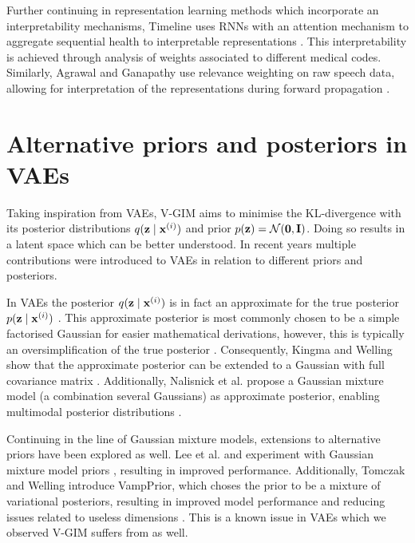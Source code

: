 	Further continuing in representation learning methods which incorporate an interpretability mechanisms, Timeline uses RNNs with an attention mechanism to aggregate sequential health to interpretable representations \cite{baiInterpretableRepresentationLearning2018}. This interpretability is achieved through analysis of weights associated to different medical codes. Similarly, Agrawal and Ganapathy use relevance weighting on raw speech data, allowing for interpretation of the representations during forward propagation \cite{agrawalInterpretableRepresentationLearning2020}.
	
	
	
		

\section{Alternative priors and posteriors in VAEs}	%
Taking inspiration from VAEs, V-GIM aims to minimise the KL-divergence with its posterior distributions $q (\mathbf{z} \mid \mathbf{x}^{(i)})$ and prior $p(\mathbf{z})=\mathcal{N}(\bm{\mathbf{0}}, \mathbf{I})$. Doing so results in a latent space which can be better understood. In recent years multiple contributions were introduced to VAEs in relation to different priors and posteriors.

In VAEs the posterior $q (\mathbf{z} \mid \mathbf{x}^{(i)})$ is in fact an approximate for the true posterior $p (\mathbf{z} \mid \mathbf{x}^{(i)})$ \cite{odaiboTutorialDerivingStandard2019}. This approximate posterior is most commonly chosen to be a simple factorised Gaussian for easier mathematical derivations, however, this is typically an oversimplification of the true posterior \cite{nalisnickApproximateInferenceDeep}. Consequently, Kingma and Welling show that the approximate posterior can be extended to a Gaussian with full covariance matrix \cite{kingmaIntroductionVariationalAutoencoders2019}. Additionally, Nalisnick et al. propose a Gaussian mixture model (a combination several Gaussians) as approximate posterior, enabling multimodal posterior distributions \cite{nalisnickApproximateInferenceDeep}.

Continuing in the line of Gaussian mixture models, extensions to alternative priors have been explored as well. Lee et al. and experiment with Gaussian mixture model priors \cite{leeMetaGMVAEMixtureGaussian2021, guoVariationalAutoencoderOptimizing2020}, resulting in improved performance. Additionally, Tomczak and Welling introduce VampPrior, which choses the prior to be a mixture of variational posteriors, resulting in improved model performance and reducing issues related to useless dimensions \cite{tomczakVAEVampPrior2018}. This is a known issue in VAEs which we observed V-GIM suffers from as well.
	


